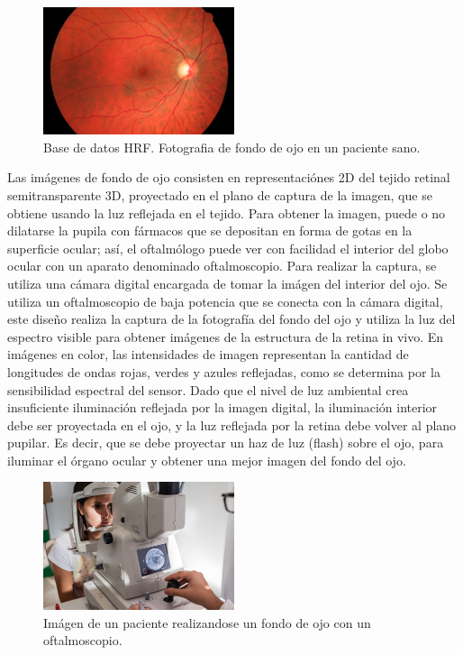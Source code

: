 \begin{figure}[H]
	{
	\centering
	\includegraphics[width=0.5\textwidth]{Figures/01_h}
	\caption[Fotografia de fondo de ojo]{Base de datos HRF. Fotografia de fondo de ojo en un paciente sano.}
	\label{fig:FotoFondoOjo}
	}
\end{figure}

Las im\'agenes de fondo de ojo consisten en representaci\'ones 2D del tejido retinal semitransparente 3D, proyectado en el plano de captura de la imagen, que se obtiene usando la luz reflejada en el tejido.
Para obtener la imagen, puede o no dilatarse la pupila con f\'armacos que se depositan en forma de gotas en la superficie ocular; as\'i, el oftalm\'ologo puede ver con facilidad el interior del globo ocular con un aparato denominado oftalmoscopio. 
Para realizar la captura, se utiliza una c\'amara digital encargada de tomar la im\'agen del interior del ojo. Se utiliza un oftalmoscopio de baja potencia que se conecta con la c\'amara digital, este diseño realiza la captura de la fotograf\'ia del fondo del ojo y utiliza la luz del espectro visible para obtener im\'agenes de la estructura de la retina in vivo. En im\'agenes en color, las intensidades de imagen representan la cantidad de longitudes de ondas rojas, verdes y azules reflejadas, como se determina por la sensibilidad espectral del sensor. Dado que el nivel de luz ambiental crea insuficiente iluminaci\'on reflejada por la imagen digital, la iluminaci\'on interior debe ser proyectada en el ojo, y la luz reflejada por la retina debe volver al plano pupilar. Es decir, que se debe proyectar un haz de luz (flash) sobre el ojo, para iluminar el \'organo ocular y obtener una mejor imagen del fondo del ojo. \cite{kanagasingam2014progress}
\begin{figure}[H]
	{
	\centering
	\includegraphics[width=0.5\textwidth]{Figures/retinografo-fondo-de-ojo}
	\caption[Fotografia de fondo de ojo]{Im\'agen de un paciente realizandose un fondo de ojo con un oftalmoscopio.}
	\label{fig:OftalmoscopioFondoOjo}
	}
\end{figure}
